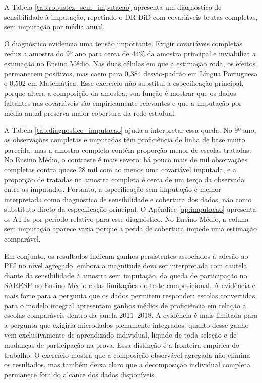 A Tabela \ref{tab:robustez_sem_imputacao} apresenta um diagnóstico de sensibilidade à imputação, repetindo o DR-DiD com covariáveis brutas completas, sem imputação por média anual.



O diagnóstico evidencia uma tensão importante. Exigir covariáveis completas reduz a amostra do 9º ano para cerca de 44\% da amostra principal e inviabiliza a estimação no Ensino Médio. Nas duas células em que a estimação roda, os efeitos permanecem positivos, mas caem para 0,384 desvio-padrão em Língua Portuguesa e 0,502 em Matemática. Esse exercício não substitui a especificação principal, porque altera a composição da amostra; sua função é mostrar que os dados faltantes nas covariáveis são empiricamente relevantes e que a imputação por média anual preserva maior cobertura da rede estadual.



A Tabela \ref{tab:diagnostico_imputacao} ajuda a interpretar essa queda. No 9º ano, as observações completas e imputadas têm proficiência de linha de base muito parecida, mas a amostra completa contém proporção menor de escolas tratadas. No Ensino Médio, o contraste é mais severo: há pouco mais de mil observações completas contra quase 28 mil com ao menos uma covariável imputada, e a proporção de tratadas na amostra completa é cerca de um terço da observada entre as imputadas. Portanto, a especificação sem imputação é melhor interpretada como diagnóstico de sensibilidade e cobertura dos dados, não como substituto direto da especificação principal. O Apêndice \ref{ap:imputacao} apresenta os ATTs por período relativo para esse diagnóstico. No Ensino Médio, a coluna sem imputação aparece vazia porque a perda de cobertura impede uma estimação comparável.

Em conjunto, os resultados indicam ganhos persistentes associados à adesão ao PEI no nível agregado, embora a magnitude deva ser interpretada com cautela diante da sensibilidade à amostra sem imputação, da queda de participação no SARESP no Ensino Médio e das limitações do teste composicional. A evidência é mais forte para a pergunta que os dados permitem responder: escolas convertidas para o modelo integral apresentam ganhos médios de proficiência em relação a escolas comparáveis dentro da janela 2011--2018. A evidência é mais limitada para a pergunta que exigiria microdados plenamente integrados: quanto desse ganho vem exclusivamente de aprendizado individual, líquido de toda seleção e de mudanças de participação na prova. Essa distinção é a fronteira empírica do trabalho. O exercício mostra que a composição observável agregada não elimina os resultados, mas também deixa claro que a decomposição individual completa permanece fora do alcance dos dados disponíveis.
